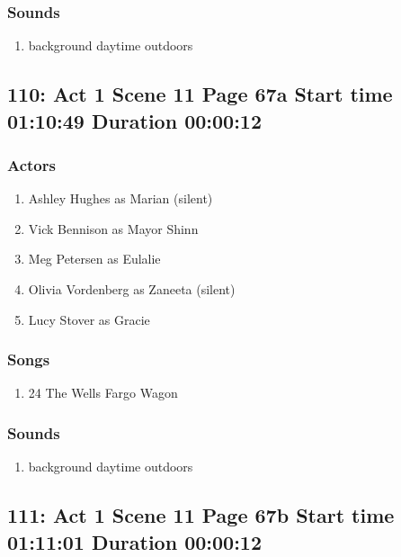\subsubsection{Sounds}
\begin{enumerate}
\item background daytime outdoors
\end{enumerate}
\subsection{110: Act 1 Scene 11 Page 67a Start time 01:10:49 Duration 00:00:12}

\subsubsection{Actors}
\begin{enumerate}
\item Ashley Hughes as Marian (silent)
\item Vick Bennison as Mayor Shinn
\item Meg Petersen as Eulalie
\item Olivia Vordenberg as Zaneeta (silent)
\item Lucy Stover as Gracie
\end{enumerate}

\subsubsection{Songs}
\begin{enumerate}
\item 24 The Wells Fargo Wagon
\end{enumerate}\subsubsection{Sounds}
\begin{enumerate}
\item background daytime outdoors
\end{enumerate}
\subsection{111: Act 1 Scene 11 Page 67b Start time 01:11:01 Duration 00:00:12}

